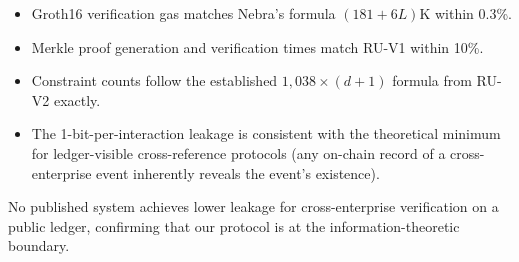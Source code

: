 \begin{itemize}
\item Groth16 verification gas matches Nebra's formula
  $(181 + 6L)$K within 0.3\%.
\item Merkle proof generation and verification times match RU-V1
  within 10\%.
\item Constraint counts follow the established
  $1{,}038 \times (d+1)$ formula from RU-V2 exactly.
\item The 1-bit-per-interaction leakage is consistent with the
  theoretical minimum for ledger-visible cross-reference protocols
  (any on-chain record of a cross-enterprise event inherently reveals
  the event's existence).
\end{itemize}

No published system achieves lower leakage for cross-enterprise
verification on a public ledger, confirming that our protocol is at
the information-theoretic boundary.
